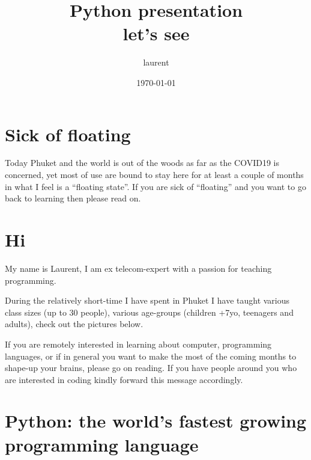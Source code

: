 \documentclass[11pt]{article}
\author{laurent}
\date{\today}
\title{Python presentation\\\medskip
\large let's see}
\begin{document}
\maketitle
\tableofcontents


\section{Sick of floating}
\label{sec:org967c942}











Today Phuket and the world is out of the woods as far as the COVID19 is concerned, yet most of use are bound to stay here for at least a couple of months in what I feel is a “floating state”. If you are sick of “floating” and you want to go back to learning then please read on.

\section{Hi}
\label{sec:orgf2d1fc1}
My name is Laurent, I am ex telecom-expert with a passion for teaching programming.













During the relatively short-time I have spent in Phuket I have taught various class sizes (up to 30 people), various age-groups (children +7yo, teenagers and adults), check out the pictures below.

If you are remotely interested in   learning about computer, programming languages, or if in general you want to make the most of the coming months to shape-up your brains, please go on reading. If you have people around you who are interested in coding kindly forward this message accordingly.







\section{Python: the world’s fastest growing programming language}
\label{sec:org5f0eecf}
\end{document}
